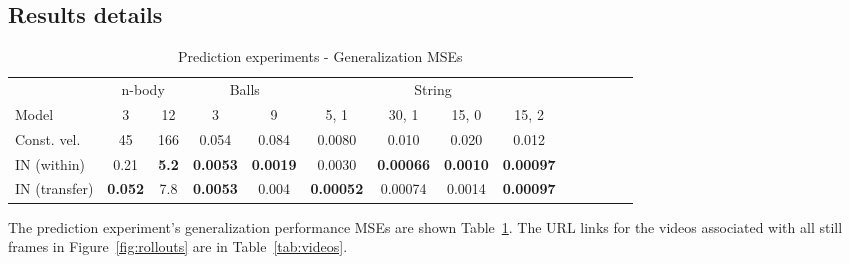 \subsection{Results details}
\begin{table}[t]
  \caption{Prediction experiments - Generalization MSEs}
  \label{tab:mse-gen}
  \centering
  \begin{tabular}{lccccccccccccc}
    \toprule
    & \multicolumn{2}{c}{n-body} & \multicolumn{2}{c}{Balls} & \multicolumn{4}{c}{String} \\
    \cmidrule(lr){2-3}
    \cmidrule(lr){4-5}
    \cmidrule(lr){6-9}
    Model & 3 & 12 & 3  & 9 & 5, 1 & 30, 1 & 15, 0 & 15, 2 \\
    \midrule
    Const. vel. & 45 & 166 & 0.054 & 0.084 & 0.0080 & 0.010 & 0.020 & 0.012 \\
    IN (within) & 0.21 & \textbf{5.2} & \textbf{0.0053} & \textbf{0.0019} & 0.0030 & \textbf{0.00066} & \textbf{0.0010} & \textbf{0.00097} \\
    IN (transfer) & \textbf{0.052} & 7.8 & \textbf{0.0053} & 0.004 & \textbf{0.00052} & 0.00074 & 0.0014 & \textbf{0.00097} \\
    \bottomrule
  \end{tabular}
\end{table}
The prediction experiment's generalization performance MSEs are shown
Table~\ref{tab:mse-gen}.
%
The URL links for the videos associated with all still frames in
Figure~\ref{fig:rollouts} are in Table~\ref{tab:videos}.
